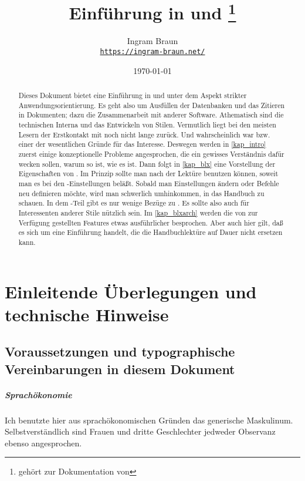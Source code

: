 \documentclass[
	11pt,        %
	table,       %
	twoside,     %
	notitlepage, %
]{scrreprt}
\title{Einführung in \blx{} und \archbib\thanks{gehört zur Dokumentation von \archbib{~v.2.3.0}}}
\author{Ingram Braun\\\href{https://ingram-braun.net/}{\texttt{https://ingram-braun.net/}}}
\date{\today}
\newcommand{\IfTeXforHt}[2]{\ifdefined\HCode#1\else#2\fi} %
\begin{document}
\IfTeXforHt{}{\maketitle}

\begin{abstract}
Dieses Dokument bietet eine Einführung in \blx{} und \archbib{} unter dem Aspekt strikter Anwendungsorientierung. Es geht also um Ausfüllen der
Datenbanken und das Zitieren in Dokumenten; dazu die Zusammenarbeit mit anderer Software. Athematisch sind die technischen Interna und
das Entwickeln von Stilen.
Vermutlich liegt bei den meisten Lesern der Erstkontakt mit \LaTeXi{} noch nicht lange zurück. Und wahrscheinlich war \blx{} bzw. \archbib{} einer der wesentlichen Gründe für das Interesse. Deswegen werden in \cref{kap_intro} zuerst einige konzeptionelle Probleme angesprochen, die ein gewisses Verständnis dafür wecken sollen, warum \blx{} so ist, wie es ist. Dann folgt in \cref{kap_blx} eine Vorstellung der Eigenschaften von \blx. Im Prinzip sollte man nach der Lektüre \blx{} benutzen können, soweit man es bei den -Einstellungen beläßt. Sobald man Einstellungen ändern oder Befehle neu definieren möchte, wird man schwerlich umhinkommen, in das Handbuch zu schauen. In dem \blx-Teil gibt es nur wenige Bezüge zu \archbib. Es sollte also auch für Interessenten anderer Stile nützlich sein. Im \cref{kap_blxarch} werden die von \archbib{} zur Verfügung gestellten Features etwas ausführlicher besprochen. Aber auch hier gilt, daß es sich um eine Einführung handelt, die die Handbuchlektüre auf Dauer nicht ersetzen kann.
\end{abstract}
 
\tableofcontents

\chapter{Einleitende Überlegungen und technische Hinweise}\label{kap_intro}

\section{Voraussetzungen und typographische Vereinbarungen in diesem Dokument}

\paragraph{Sprachökonomie} Ich benutzte hier aus sprachökonomischen Gründen das generische Maskulinum. Selbstverständlich sind Frauen und dritte Geschlechter jedweder Observanz ebenso angesprochen.
\end{document}
